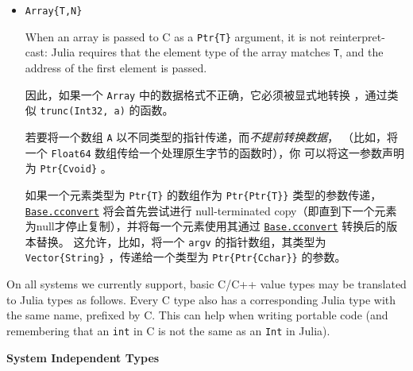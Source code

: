\begin{itemize}
\item \texttt{Array\{T,N\}}

When an array is passed to C as a \texttt{Ptr\{T\}} argument, it is not reinterpret-cast: Julia requires that the element type of the array matches \texttt{T}, and the address of the first element is passed.

因此，如果一个 \texttt{Array} 中的数据格式不正确，它必须被显式地转换 ，通过类似 \texttt{trunc(Int32, a)} 的函数。

若要将一个数组 \texttt{A} 以不同类型的指针传递，而\emph{不提前转换数据}， （比如，将一个 \texttt{Float64} 数组传给一个处理原生字节的函数时），你 可以将这一参数声明为 \texttt{Ptr\{Cvoid\}} 。

如果一个元素类型为 \texttt{Ptr\{T\}} 的数组作为 \texttt{Ptr\{Ptr\{T\}\}} 类型的参数传递， \hyperlink{16487788729383051927}{\texttt{Base.cconvert}}  将会首先尝试进行 null-terminated copy（即直到下一个元素为null才停止复制），并将每一个元素使用其通过 \hyperlink{16487788729383051927}{\texttt{Base.cconvert}} 转换后的版本替换。 这允许，比如，将一个 \texttt{argv} 的指针数组，其类型为 \texttt{Vector\{String\}} ，传递给一个类型为 \texttt{Ptr\{Ptr\{Cchar\}\}} 的参数。

\end{itemize}


On all systems we currently support, basic C/C++ value types may be translated to Julia types as follows. Every C type also has a corresponding Julia type with the same name, prefixed by C. This can help when writing portable code (and remembering that an \texttt{int} in C is not the same as an \texttt{Int} in Julia).



\textbf{System Independent Types}




